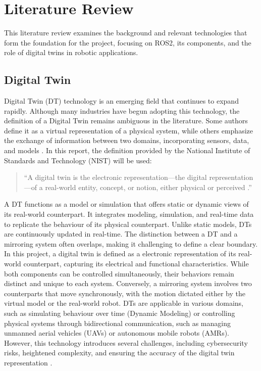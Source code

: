 \chapter{Literature Review}

This literature review examines the background and relevant technologies that form the foundation for the project, focusing on ROS2, its components, and the role of digital twins in robotic applications. 

\section{Digital Twin}
Digital Twin (DT) technology is an emerging field that continues to expand rapidly. Although many industries have begun adopting this technology, the definition of a Digital Twin remains ambiguous in the literature. Some authors define it as a virtual representation of a physical system, while others emphasize the exchange of information between two domains, incorporating sensors, data, and models \autocite{staczekDigitalTwinApproach2021}. In this report, the definition provided by the National Institute of Standards and Technology (NIST) will be used:

\begin{quote}
``A digital twin is the electronic representation—the digital representation—of a real-world entity, concept, or notion, either physical or perceived \autocite{voasDraftConsiderationsDigital2021}.''
\end{quote}

A DT functions as a model or simulation that offers static or dynamic views of its real-world counterpart. It integrates modeling, simulation, and real-time data to replicate the behaviour of its physical counterpart. Unlike static models, DTs are continuously updated in real-time.
The distinction between a DT and a mirroring system often overlaps, making it challenging to define a clear boundary. In this project, a digital twin is defined as a electronic representation of its real-world counterpart, capturing its electrical and functional characteristics. While both components can be controlled simultaneously, their behaviors remain distinct and unique to each system. Conversely, a mirroring system involves two counterparts that move synchronously, with the motion dictated either by the virtual model or the real-world robot.
DTs are applicable in various domains, such as simulating behaviour over time (Dynamic Modeling) or controlling physical systems through bidirectional communication, such as managing unmanned aerial vehicles (UAVs) or autonomous mobile robots (AMRs).
However, this technology introduces several challenges, including cybersecurity risks, heightened complexity, and ensuring the accuracy of the digital twin representation \autocite{voasDraftConsiderationsDigital2021}.


